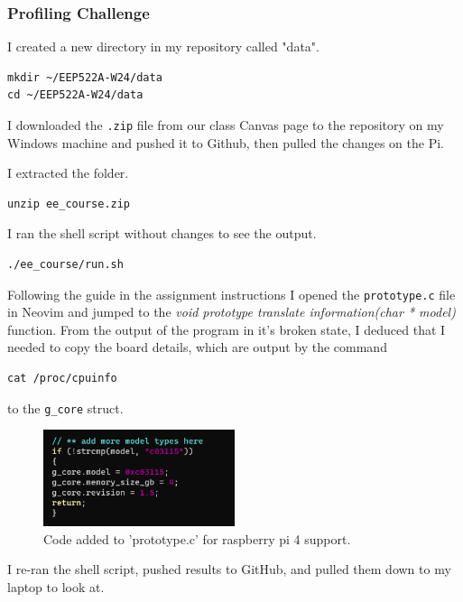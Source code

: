 \documentclass[12pt]{article}
\begin{document}
\subsubsection{Profiling Challenge}

I created a new directory in my repository called "data".

\begin{lstlisting}
mkdir ~/EEP522A-W24/data
cd ~/EEP522A-W24/data
\end{lstlisting}

I downloaded the \verb|.zip| file from our class Canvas page to the repository on my Windows machine and pushed it to Github, then pulled the changes on the Pi.

I extracted the folder.

\begin{lstlisting}
unzip ee_course.zip
\end{lstlisting}

I ran the shell script without changes to see the output.

\begin{lstlisting}
./ee_course/run.sh
\end{lstlisting}

Following the guide in the assignment instructions I opened the \verb|prototype.c| file in Neovim and jumped to the \textit{void prototype translate information(char * model)}  function. From the output of the program in it's broken state, I deduced that I needed to copy the board details, which are output by the command

\begin{lstlisting}
cat /proc/cpuinfo
\end{lstlisting}
to the \verb|g_core| struct.

\begin{figure}[h]
\centering
\includegraphics[width=0.5\textwidth]{prototype_edit.png} %
\caption{Code added to 'prototype.c' for raspberry pi 4 support.}
\label{fig:prototype_edit}
\end{figure}

I re-ran the shell script, pushed results to GitHub, and pulled them down to my laptop to look at.
\end{document}
